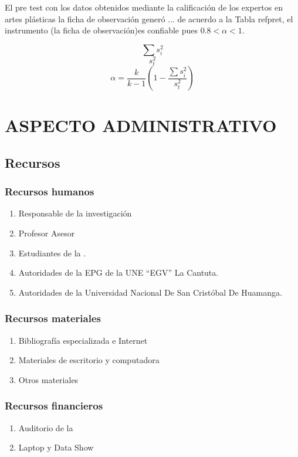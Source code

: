 \documentclass[12pt,a4paper]{article}
\begin{document}
El pre test con los datos obtenidos mediante la calificación de los expertos en artes plásticas la ficha de observación generó ... de acuerdo a la Tabla ref{pret}, el instrumento (la ficha de observación)es confiable pues $0.8<\alpha<1$.

$$\sum s_i^2$$
$$s_t^2$$
$$\alpha=\frac{k}{k-1}\left(1-\frac{\sum s_i^2}{s_t^2}\right)$$


\section{ASPECTO  ADMINISTRATIVO}
\subsection{Recursos}

\subsubsection{Recursos humanos}
\begin{enumerate}
  \item Responsable de la investigación
  \item Profesor Asesor
  \item Estudiantes de la \lugar.
  \item Autoridades de la EPG de la UNE “EGV” La Cantuta.
  \item Autoridades de la Universidad Nacional De San Cristóbal De Huamanga.
\end{enumerate}

\subsubsection{Recursos materiales}
\begin{enumerate}
\item Bibliografía especializada e Internet %
\item Materiales de escritorio y computadora %
\item Otros materiales %
\end{enumerate}

\subsubsection{Recursos financieros}
\begin{enumerate}
\item Auditorio de la \lugar
\item Laptop y Data Show
\end{enumerate}
\end{document}
